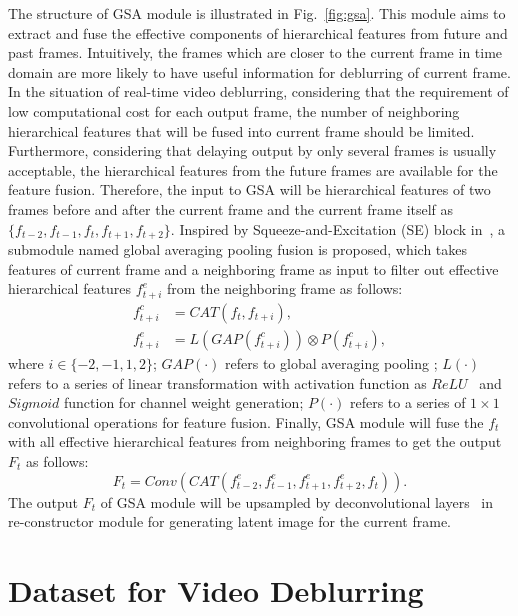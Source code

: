 \documentclass[twocolumn]{svjour3}          \smartqed  \usepackage{graphicx}
\begin{document}
The structure of GSA module is illustrated in Fig.~\ref{fig:gsa}. This module aims to extract and fuse the effective components of hierarchical features from future and past frames. Intuitively, the frames which are closer to the current frame in time domain are more likely to have useful information for deblurring of current frame. In the situation of real-time video deblurring, considering that the requirement of low computational cost for each output frame, the number of neighboring hierarchical features that will be fused into current frame should be limited. Furthermore, considering that delaying output by only several frames is usually acceptable, the hierarchical features from the future frames are available for the feature fusion. Therefore, the input to GSA will be hierarchical features of two frames before and after the current frame and the current frame itself as $\{f_{t-2}, f_{t-1}, f_{t}, f_{t+1}, f_{t+2}\}$. Inspired by Squeeze-and-Excitation (SE) block in~\cite{hu2018squeeze}, a submodule named global averaging pooling fusion is proposed, which takes features of current frame and a neighboring frame as input to filter out effective hierarchical features $f^e_{t+i}$ from the neighboring frame as follows:
\begin{align}
f^{c}_{t+i} &= \mathit{CAT}(f_t, f_{t+i}),\\
f^{e}_{t+i} &= \mathit{L}(\mathit{GAP}(f^{c}_{t+i})) \otimes \mathit{P}(f^{c}_{t+i}), 
\end{align}
where $i \in \{-2,-1,1,2\}$; $\mathit{GAP}(\cdot)$ refers to global averaging pooling \cite{lin2013network}; $\mathit{L}(\cdot)$ refers to a series of linear transformation with activation function as $ReLU$~\cite{nair2010rectified} and $Sigmoid$ function for channel weight generation; $\mathit{P}(\cdot)$ refers to a series of $1\times1$ convolutional operations for feature fusion. Finally, GSA module will fuse the $f_t$ with all effective hierarchical features from neighboring frames to get the output $F_t$ as follows:
\begin{equation}
F_t = \mathit{Conv}(\mathit{CAT}(f^{e}_{t-2}, f^{e}_{t-1}, f^{e}_{t+1}, f^{e}_{t+2}, f_t)).
\end{equation}
The output $F_t$ of GSA module will be upsampled by deconvolutional layers~\cite{dumoulin2016guide} in re-constructor module for generating latent image for the current frame.

\section{Dataset for Video Deblurring}
\end{document}
